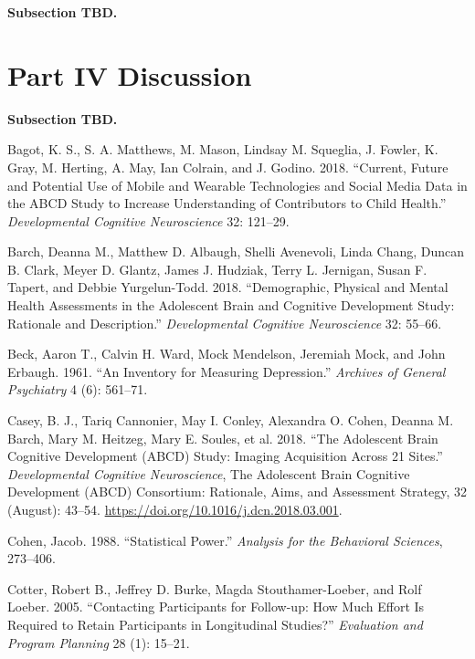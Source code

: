 \documentclass[
  letterpaper,
  DIV=11,
  numbers=noendperiod]{scrartcl}
\newlength{\cslhangindent}
\newlength{\cslentryspacingunit} %
\newenvironment{CSLReferences}[2] %
 {%
  \setlength{\parindent}{0pt}
  \ifodd #1
  \let\oldpar\par
  \def\par{\hangindent=\cslhangindent\oldpar}
  \fi
  \setlength{\parskip}{#2\cslentryspacingunit}
 }%
 {}
\begin{document}
\label{sec:headings} \textbf{Subsection TBD.}

\hypertarget{part-iv-discussion}{%
\section{Part IV Discussion}\label{part-iv-discussion}}

\label{sec:headings} \textbf{Subsection TBD.}

\hypertarget{refs}{}
\begin{CSLReferences}{1}{0}
\leavevmode{}%
Bagot, K. S., S. A. Matthews, M. Mason, Lindsay M. Squeglia, J. Fowler,
K. Gray, M. Herting, A. May, Ian Colrain, and J. Godino. 2018.
{``Current, Future and Potential Use of Mobile and Wearable Technologies
and Social Media Data in the {ABCD} Study to Increase Understanding of
Contributors to Child Health.''} \emph{Developmental Cognitive
Neuroscience} 32: 121--29.

\leavevmode{}%
Barch, Deanna M., Matthew D. Albaugh, Shelli Avenevoli, Linda Chang,
Duncan B. Clark, Meyer D. Glantz, James J. Hudziak, Terry L. Jernigan,
Susan F. Tapert, and Debbie Yurgelun-Todd. 2018. {``Demographic,
Physical and Mental Health Assessments in the Adolescent Brain and
Cognitive Development Study: {Rationale} and Description.''}
\emph{Developmental Cognitive Neuroscience} 32: 55--66.

\leavevmode{}%
Beck, Aaron T., Calvin H. Ward, Mock Mendelson, Jeremiah Mock, and John
Erbaugh. 1961. {``An Inventory for Measuring Depression.''}
\emph{Archives of General Psychiatry} 4 (6): 561--71.

\leavevmode{}%
Casey, B. J., Tariq Cannonier, May I. Conley, Alexandra O. Cohen, Deanna
M. Barch, Mary M. Heitzeg, Mary E. Soules, et al. 2018. {``The
{Adolescent} {Brain} {Cognitive} {Development} ({ABCD}) Study: {Imaging}
Acquisition Across 21 Sites.''} \emph{Developmental Cognitive
Neuroscience}, The {Adolescent} {Brain} {Cognitive} {Development}
({ABCD}) {Consortium}: {Rationale}, {Aims}, and {Assessment} {Strategy},
32 (August): 43--54. \url{https://doi.org/10.1016/j.dcn.2018.03.001}.

\leavevmode{}%
Cohen, Jacob. 1988. {``Statistical Power.''} \emph{Analysis for the
Behavioral Sciences}, 273--406.

\leavevmode{}%
Cotter, Robert B., Jeffrey D. Burke, Magda Stouthamer-Loeber, and Rolf
Loeber. 2005. {``Contacting Participants for Follow-up: How Much Effort
Is Required to Retain Participants in Longitudinal Studies?''}
\emph{Evaluation and Program Planning} 28 (1): 15--21.


\end{CSLReferences}
\end{document}

